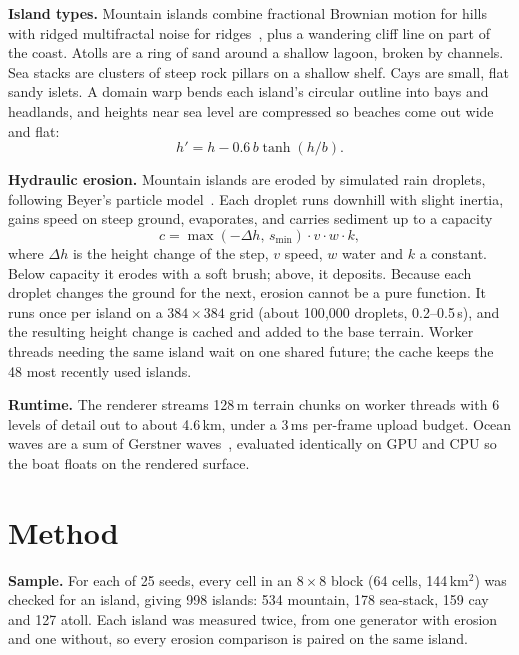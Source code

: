 \documentclass[10pt,twocolumn]{article}
\begin{document}
\textbf{Island types.} Mountain islands combine fractional Brownian motion for hills with ridged multifractal noise for ridges~\cite{ebert}, plus a wandering cliff line on part of the coast. Atolls are a ring of sand around a shallow lagoon, broken by channels. Sea stacks are clusters of steep rock pillars on a shallow shelf. Cays are small, flat sandy islets. A domain warp bends each island's circular outline into bays and headlands, and heights near sea level are compressed so beaches come out wide and flat:
\begin{equation}
h' = h - 0.6\, b \tanh(h/b).
\end{equation}

\textbf{Hydraulic erosion.} Mountain islands are eroded by simulated rain droplets, following Beyer's particle model~\cite{beyer}. Each droplet runs downhill with slight inertia, gains speed on steep ground, evaporates, and carries sediment up to a capacity
\begin{equation}
c = \max(-\Delta h,\, s_{\min}) \cdot v \cdot w \cdot k,
\end{equation}
where $\Delta h$ is the height change of the step, $v$ speed, $w$ water and $k$ a constant. Below capacity it erodes with a soft brush; above, it deposits. Because each droplet changes the ground for the next, erosion cannot be a pure function. It runs once per island on a $384\times384$ grid (about 100{,}000 droplets, 0.2--0.5\,s), and the resulting height change is cached and added to the base terrain. Worker threads needing the same island wait on one shared future; the cache keeps the 48 most recently used islands.

\textbf{Runtime.} The renderer streams 128\,m terrain chunks on worker threads with 6 levels of detail out to about 4.6\,km, under a 3\,ms per-frame upload budget. Ocean waves are a sum of Gerstner waves~\cite{tessendorf}, evaluated identically on GPU and CPU so the boat floats on the rendered surface.

\section{Method}\label{sec:method}
\textbf{Sample.} For each of 25 seeds, every cell in an $8\times8$ block (64 cells, 144\,km$^2$) was checked for an island, giving 998 islands: 534 mountain, 178 sea-stack, 159 cay and 127 atoll. Each island was measured twice, from one generator with erosion and one without, so every erosion comparison is paired on the same island.
\end{document}
